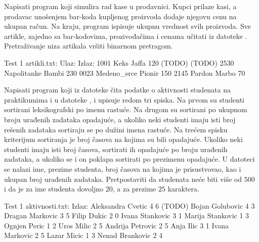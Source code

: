 \begin{Exercise}[label=512]
  Napisati program koji simulira rad kase u prodavnici. Kupci prilaze
  kasi, a prodavac unošenjem bar-koda kupljenog proizvoda dodaje
  njegovu cenu na ukupan račun. Na kraju, program ispisuje ukupnu
  vrednost svih proizvoda. Sve artikle, zajedno sa bar-kodovima,
  prozivođačima i cenama učitati iz datoteke
  . Pretraživanje niza artikala vršiti binarnom
  pretragom.
  
\begin{maxitest}
\begin{test}{Test 1}
artikli.txt:                         Ulaz:           Izlaz:
1001 Keks Jaffa 120                  (TODO)          (TODO)
2530 Napolitanke Bambi	230
0023 Medeno_srce Pionir 150
2145 Pardon Marbo 70
\end{test}
\end{maxitest}
  
\end{Exercise}

\begin{Exercise}[label=513]
   Napisati program koji iz datoteke  čita
   podatke o aktivnosti studenata na praktikumima i u datoteke
   ,  i  upisuje redom
   tri spiska. Na prvom su studenti sortirani leksikografski po imenu
   rastuće. Na drugom su sortirani po ukupnom broju urađenih zadataka
   opadajuće, a ukoliko neki studenti imaju isti broj rešenih zadataka
   sortiraju se po dužini imena rastuće. Na trećem spisku kriterijum
   sortiranja je broj časova na kojima su bili opadajuće. Ukoliko neki
   studenti imaju isti broj časova, sortirati ih opadajuće po broju
   urađenih zadataka, a ukoliko se i on poklapa sortirati po prezimenu
   opadajuće. U datoteci se nalazi ime, prezime studenta, broj časova
   na kojima je prisustvovao, kao i ukupan broj urađenih
   zadataka. Pretpostaviti da studenata neće biti više od $500$ i da
   je za ime studenta dovoljno $20$, a za prezime $25$ karaktera.
  
\begin{miditest}
\begin{test}{Test 1}
aktivnosti.txt:               Izlaz:
Aleksandra Cvetic 4 6         (TODO)
Bojan Golubovic 4 3
Dragan Markovic 3 5
Filip Dukic 2 0 
Ivana Stankovic 3 1
Marija Stankovic 1 3 
Ognjen Peric 1 2
Uros Milic 2 5
Andrija Petrovic 2 5
Anja Ilic 3 1
Ivana Markovic 2 5
Lazar Micic 1 3
Nenad Brankovic 2 4
\end{test}
\end{miditest}
  
\end{Exercise}

